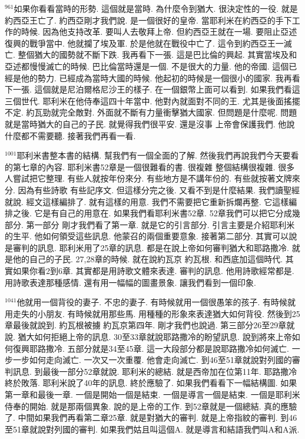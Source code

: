 \documentclass{book}
\begin{document}
$^{961}$如果你看看當時的形勢.
這個就是當時.
為什麼令到猶大.
很決定性的一役.
就是約西亞王亡了.
約西亞剛才我們說.
是一個很好的皇帝.
當耶利米在約西亞的手下工作的時候.
因為他支持改革.
要叫人去敬拜上帝.
但約西亞王就在一場.
要阻止亞述復興的戰爭當中.
他就攔了埃及軍.
於是他就在戰役中亡了.
這令到約西亞王一滅亡.
整個猶大的國勢就不斷下跌.
我再看下一張.
這是巴比倫的興起.
其實當埃及和亞述都慢慢滅亡的時候.
巴比倫當時還是一個.
不是很大的力量.
他的帝國.
這個已經是他的勢力.
已經成為當時大國的時候.
他起初的時候是一個很小的國家.
我再看下一張.
這個就是尼泊爾格尼沙王的樣子.
在一個銀幣上面可以看到.
如果我們看這三個世代.
耶利米在他侍奉這四十年當中.
他對內就面對不同的王.
尤其是後面搖擺不定.
約瓦勁就完全敵對.
外面就不斷有力量衝擊猶大國家.
但問題是什麼呢.
問題就是當時猶大的自己的子民.
就覺得我們很平安.
還是沒事 上帝會保護我們.
他說什麼都不需要聽.
接著我們再看一看.

$^{1001}$耶利米書整本書的結構.
幫我們有一個全面的了解.
然後我們再說我們今天要看的第七章的內容.
耶利米書52章是一個很難看的書.
很複雜 整個結構很複雜.
很多人嘗試把它整理.
有些人就按年份來分.
有些地方是不講年份的.
有些就按著文牌來分.
因為有些詩歌 有些記序文.
但這樣分完之後.
又看不到是什麼結果.
我們讀聖經就說.
經文這樣編排了.
就有這樣的用意.
我們不需要把它重新拆爛再整.
它這樣編排之後.
它是有自己的用意在.
如果我們看耶利米書52章.
52章我們可以把它分成幾部分.
第一部分 剛才我們看了第一章.
就是它的引言部分.
引言主要是介紹耶利米的生平.
他如何領受這些訊息.
他蒙召的兩個重要意象.
接著第二部分.
其實可以說是審判的訊息.
耶利米用了25章的訊息.
都是在說上帝如何審判猶大和耶路撒冷.
就是他的自己的子民.
27,28章的時候.
就在說約瓦京 約瓦根.
和西底加這個時代.
其實如果你看2到6章.
其實都是用詩歌文體來表達.
審判的訊息.
他用詩歌經常都是.
用詩歌表達那種感情.
還有用一幅幅的圖畫景象.
讓我們看到一個印象.

$^{1041}$他就用一個背役的妻子.
不忠的妻子.
有時候就用一個很愚笨的孩子.
有時候就用走失的小朋友.
有時候就用那些馬.
用種種的形象來表達猶大如何背役.
然後到25章最後就說到.
約瓦根被擄 約瓦京第四年.
剛才我們也說過.
第三部分26至29章就說.
猶大如何拒絕上帝的訊息.
30至33章就說耶路撒冷的盼望訊息.
說到將來上帝如何復興耶路撒冷.
五部分就是34至45章.
這一大段部分都是說耶路撒冷如何滅亡.
一步一步如何走向滅亡.
一次又一次重覆.
他會走向滅亡.
到46至51章就說對列國的審判訊息.
到最後一部分52章就說.
耶利米的總結.
就是西帝加在位第11年.
耶路撒冷終於敗落.
耶利米說了40年的訊息.
終於應驗了.
如果我們看看下一幅結構圖.
如果第一章和最後一章.
一個是開始一個是結束.
一個是導言一個是結束.
一個是耶利米侍奉的開始.
就是那兩個異象.
說的是上帝的工作.
到52章就是一個總結.
真的應驗了.
中間如果我們再看第二章25章.
就是對猶大的審判.
就是上帝指紋的審判.
到46至51章就說對列國的審判.
如果我們姑且叫這個A.
就是導言和結語我們叫A和A派.
\end{document}
